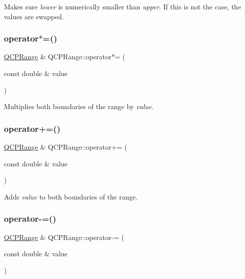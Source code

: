 Makes sure {\itshape lower} is numerically smaller than {\itshape upper}. If this is not the case, the values are swapped. \mbox{\label{class_q_c_p_range_a6876aa9620ff2f0f7f1873f998372cef}} 
\subsubsection{\texorpdfstring{operator$\ast$=()}{operator*=()}}
{\footnotesize\ttfamily \mbox{\hyperlink{class_q_c_p_range}{Q\+C\+P\+Range}} \& Q\+C\+P\+Range\+::operator$\ast$= (\begin{DoxyParamCaption}\item[{const double \&}]{value }\end{DoxyParamCaption})\hspace{0.3cm}{\ttfamily [inline]}}

Multiplies both boundaries of the range by {\itshape value}. \mbox{\label{class_q_c_p_range_afea7c1aa7d08f061cd9bd8832f957df8}} 
\subsubsection{\texorpdfstring{operator+=()}{operator+=()}}
{\footnotesize\ttfamily \mbox{\hyperlink{class_q_c_p_range}{Q\+C\+P\+Range}} \& Q\+C\+P\+Range\+::operator+= (\begin{DoxyParamCaption}\item[{const double \&}]{value }\end{DoxyParamCaption})\hspace{0.3cm}{\ttfamily [inline]}}

Adds {\itshape value} to both boundaries of the range. \mbox{\label{class_q_c_p_range_a95894bcb15a16a75ca564091374e2191}} 
\subsubsection{\texorpdfstring{operator-\/=()}{operator-=()}}
{\footnotesize\ttfamily \mbox{\hyperlink{class_q_c_p_range}{Q\+C\+P\+Range}} \& Q\+C\+P\+Range\+::operator-\/= (\begin{DoxyParamCaption}\item[{const double \&}]{value }\end{DoxyParamCaption})\hspace{0.3cm}{\ttfamily [inline]}}

